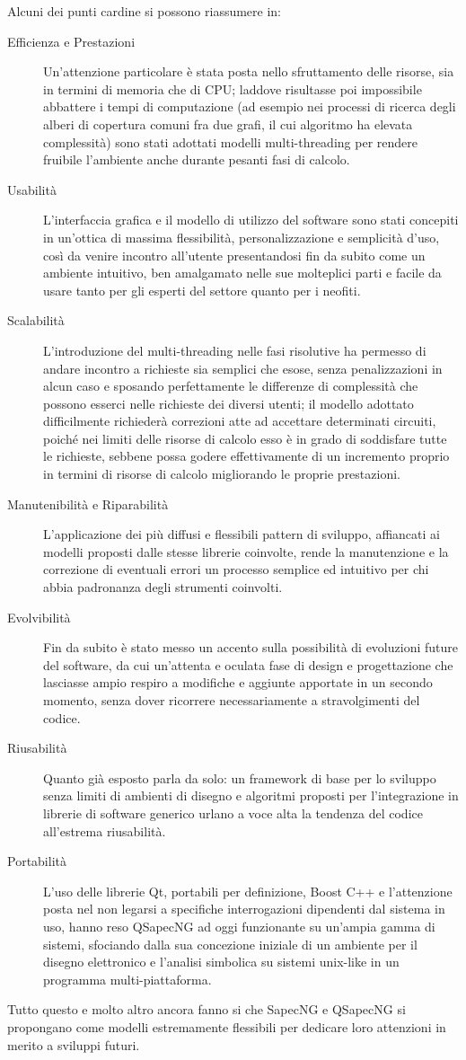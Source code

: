 Alcuni dei punti cardine si possono riassumere in:
\begin{description}
 \item[Efficienza e Prestazioni] Un'attenzione particolare è stata posta nello sfruttamento delle risorse, sia in termini di memoria che di CPU; laddove risultasse poi impossibile abbattere i tempi di computazione (ad esempio nei processi di ricerca degli alberi di copertura comuni fra due grafi, il cui algoritmo ha elevata complessità) sono stati adottati modelli multi-threading per rendere fruibile l'ambiente anche durante pesanti fasi di calcolo.
 \item[Usabilità] L'interfaccia grafica e il modello di utilizzo del software sono stati concepiti in un'ottica di massima flessibilità, personalizzazione e semplicità d'uso, così da venire incontro all'utente presentandosi fin da subito come un ambiente intuitivo, ben amalgamato nelle sue molteplici parti e facile da usare tanto per gli esperti del settore quanto per i neofiti.
 \item[Scalabilità] L'introduzione del multi-threading nelle fasi risolutive ha permesso di andare incontro a richieste sia semplici che esose, senza penalizzazioni in alcun caso e sposando perfettamente le differenze di complessità che possono esserci nelle richieste dei diversi utenti; il modello adottato difficilmente richiederà correzioni atte ad accettare determinati circuiti, poiché nei limiti delle risorse di calcolo esso è in grado di soddisfare tutte le richieste, sebbene possa godere effettivamente di un incremento proprio in termini di risorse di calcolo migliorando le proprie prestazioni.
 \item[Manutenibilità e Riparabilità] L'applicazione dei più diffusi e flessibili pattern di sviluppo, affiancati ai modelli proposti dalle stesse librerie coinvolte, rende la manutenzione e la correzione di eventuali errori un processo semplice ed intuitivo per chi abbia padronanza degli strumenti coinvolti.
 \item[Evolvibilità] Fin da subito è stato messo un accento sulla possibilità di evoluzioni future del software, da cui un'attenta e oculata fase di design e progettazione che lasciasse ampio respiro a modifiche e aggiunte apportate in un secondo momento, senza dover ricorrere necessariamente a stravolgimenti del codice.
 \item[Riusabilità] Quanto già esposto parla da solo: un framework di base per lo sviluppo senza limiti di ambienti di disegno e algoritmi proposti per l'integrazione in librerie di software generico urlano a voce alta la tendenza del codice all'estrema riusabilità.
 \item[Portabilità] L'uso delle librerie Qt, portabili per definizione, Boost C++ e l'attenzione posta nel non legarsi a specifiche interrogazioni dipendenti dal sistema in uso, hanno reso QSapecNG ad oggi funzionante su un'ampia gamma di sistemi, sfociando dalla sua concezione iniziale di un ambiente per il disegno elettronico e l'analisi simbolica su sistemi unix-like in un programma multi-piattaforma.
\end{description}

Tutto questo e molto altro ancora fanno si che SapecNG e QSapecNG si propongano come modelli estremamente flessibili per dedicare loro attenzioni in merito a sviluppi futuri.
